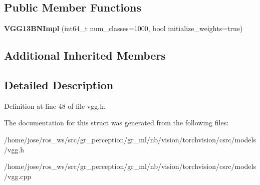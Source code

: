 \subsection*{Public Member Functions}
\begin{DoxyCompactItemize}
\item 
\mbox{\label{structvision_1_1models_1_1VGG13BNImpl_a11ed3591a076150fdd02a9806121d86c}} 
{\bfseries V\+G\+G13\+B\+N\+Impl} (int64\+\_\+t num\+\_\+classes=1000, bool initialize\+\_\+weights=true)
\end{DoxyCompactItemize}
\subsection*{Additional Inherited Members}


\subsection{Detailed Description}


Definition at line 48 of file vgg.\+h.



The documentation for this struct was generated from the following files\+:\begin{DoxyCompactItemize}
\item 
/home/jose/ros\+\_\+ws/src/gr\+\_\+perception/gr\+\_\+ml/nb/vision/torchvision/csrc/models/vgg.\+h\item 
/home/jose/ros\+\_\+ws/src/gr\+\_\+perception/gr\+\_\+ml/nb/vision/torchvision/csrc/models/vgg.\+cpp\end{DoxyCompactItemize}
